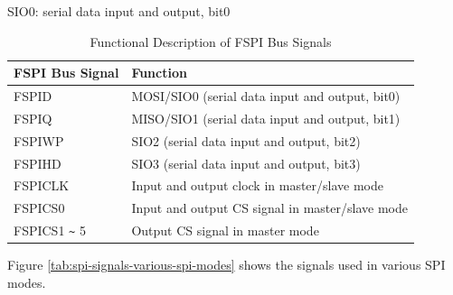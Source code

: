\documentclass[main\_\_EN.tex]{subfiles}
\begin{document}
\begin{ThreePartTable}

\begin{TableNotes}
    \item[a] SIO0: serial data input and output, bit0
\end{TableNotes}

\begin{longtable}[c]{|l|l|}
\caption{Functional Description of FSPI Bus Signals}
\label{tab:spi-fspi-bus-signals-func-descr}\\
\hline
    \rowcolor{lightgray}
    \textbf{FSPI Bus Signal}& \textbf{Function} \\
    \hline
    \endfirsthead

    \endlastfoot
    FSPID & MOSI/SIO0 (serial data input and output, bit0)\\
    \hline
    FSPIQ & MISO/SIO1 (serial data input and output, bit1) \\\hline
    FSPIWP & SIO2 (serial data input and output, bit2) \\\hline
    FSPIHD & SIO3 (serial data input and output, bit3) \\\hline
    FSPICLK & Input and output clock in master/slave mode \\\hline
    FSPICS0 & Input and output CS signal in master/slave mode \\\hline
    FSPICS1 \verb+~+ 5 & Output CS signal in master mode\\\hline
\end{longtable}

\end{ThreePartTable}

Figure \ref{tab:spi-signals-various-spi-modes} shows the signals used in various SPI modes.
\end{document}
